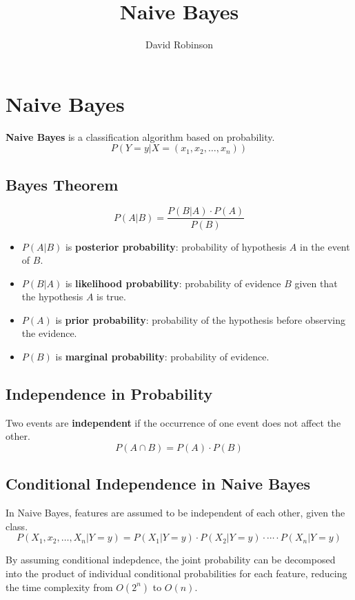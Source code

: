 \documentclass{article}
\title{Naive Bayes}
\author{David Robinson}
\date{}
\begin{document}
\maketitle

\section*{Naive Bayes}

\textbf{Naive Bayes} is a classification algorithm based on probability.
\[P(Y=y|X=(x_1,x_2,\ldots,x_n))\]

\subsection*{Bayes Theorem}

\[P(A|B)=\frac{P(B|A)\cdot P(A)}{P(B)}\]

\begin{itemize}
    \item $P(A|B)$ is \textbf{posterior probability}: probability of hypothesis $A$ in the event of $B$.
    \item $P(B|A)$ is \textbf{likelihood probability}: probability of evidence $B$ given that the hypothesis $A$ is true.
    \item $P(A)$ is \textbf{prior probability}: probability of the hypothesis before observing the evidence.
    \item $P(B)$ is \textbf{marginal probability}: probability of evidence.
\end{itemize}

\subsection*{Independence in Probability}
Two events are \textbf{independent} if the occurrence of one event does not affect the other.
\[P(A\cap B)=P(A)\cdot P(B)\]

\subsection*{Conditional Independence in Naive Bayes}
In Naive Bayes, features are assumed to be independent of each other, given the class.
\[P(X_1,x_2,\ldots,X_n|Y=y)=P(X_1 | Y=y)\cdot P(X_2|Y=y)\cdot\cdots\cdot P(X_n | Y=y)\]

By assuming conditional indepdence, the joint probability can be decomposed into the product of individual conditional probabilities for each feature, reducing the time complexity from $O(2^n)$ to $O(n)$.
\end{document}
